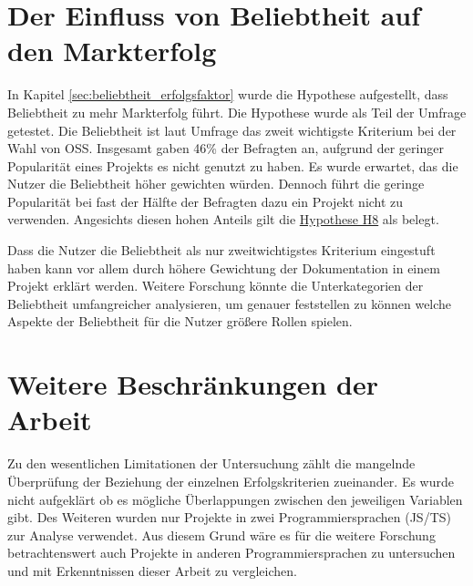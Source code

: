 \section{Der Einfluss von Beliebtheit auf den Markterfolg}

In Kapitel \ref{sec:beliebtheit_erfolgsfaktor} wurde die Hypothese aufgestellt, dass Beliebtheit zu
mehr Markterfolg führt.
Die Hypothese wurde als Teil der Umfrage getestet.
Die Beliebtheit ist laut Umfrage das zweit wichtigste Kriterium bei der Wahl von OSS.
Insgesamt gaben 46\% der Befragten an, aufgrund der geringer Popularität eines Projekts es nicht
genutzt zu haben.
Es wurde erwartet, das die Nutzer die Beliebtheit höher gewichten würden.
Dennoch führt die geringe Popularität bei fast der Hälfte der Befragten dazu ein Projekt nicht 
zu verwenden. Angesichts diesen hohen Anteils gilt die \hyperref[H:8]{Hypothese H8} als belegt.

Dass die Nutzer die Beliebtheit als nur zweitwichtigstes Kriterium eingestuft haben kann vor allem
durch höhere Gewichtung der Dokumentation in einem Projekt erklärt werden.
Weitere Forschung könnte die Unterkategorien der Beliebtheit umfangreicher analysieren, um genauer
feststellen zu können welche Aspekte der Beliebtheit für die Nutzer größere Rollen spielen.



\section{Weitere Beschränkungen der Arbeit}
Zu den wesentlichen Limitationen der Untersuchung zählt die mangelnde Überprüfung der Beziehung der
einzelnen Erfolgskriterien zueinander. Es wurde nicht aufgeklärt ob es mögliche Überlappungen zwischen
den jeweiligen Variablen gibt. Des Weiteren wurden nur Projekte in zwei Programmiersprachen (JS/TS) 
zur Analyse verwendet. Aus diesem Grund wäre es für die weitere Forschung betrachtenswert auch 
Projekte in anderen Programmiersprachen zu untersuchen und mit Erkenntnissen dieser Arbeit zu vergleichen.






